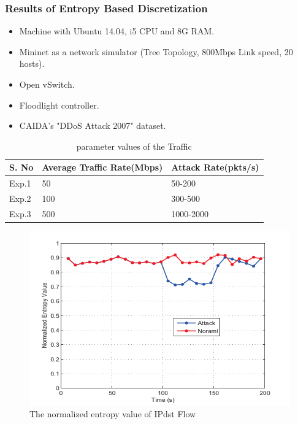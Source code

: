 \documentclass[10pt]{beamer}
\begin{document}
\begin{frame}
\frametitle{Results of Entropy Based Discretization}
\begin{itemize}
\footnotesize
\item
Machine with Ubuntu 14.04, i5 CPU and 8G RAM.
\item
Mininet as a network simulator (Tree Topology, 800Mbps Link speed, 20 hosts).
\item
Open vSwitch.
\item 
Floodlight controller.
\item
CAIDA's "DDoS Attack 2007" dataset.
\end{itemize}
\scriptsize
\vspace{0.1cm}
\begin{table}
\begin{center}
\begin{tabular}{ | m{2cm} | m{2cm}| m{2cm} |} 
\hline
\textbf{S. No} & \textbf{Average Traffic Rate(Mbps)} & \textbf{Attack Rate(pkts/s)} \\
\hline
Exp.1 &
50 &
50-200 \\
\hline
Exp.2 &
100 &
300-500 \\ 
\hline
Exp.3 &
500 &
1000-2000 \\
\hline
\end{tabular}
\end{center}
\caption{parameter values of the Traffic}
\end{table}
\begin{figure}[h]
\includegraphics[scale=0.2]{Entropy.png}
\caption{\footnotesize The normalized entropy value of IPdst Flow}
\end{figure}

\end{frame}
\end{document}
